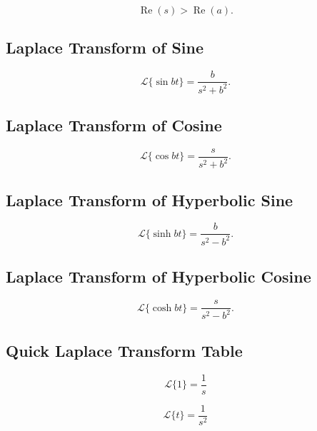 \[
\operatorname{Re}(s)>\operatorname{Re}(a).
\]

\subsection{Laplace Transform of Sine}
\label{subsec:laplace-sine}

\[
\boxed{
\mathcal{L}\{\sin bt\}
=
\frac{
b
}{
s^2+b^2
}.
}
\]

\subsection{Laplace Transform of Cosine}
\label{subsec:laplace-cosine}

\[
\boxed{
\mathcal{L}\{\cos bt\}
=
\frac{
s
}{
s^2+b^2
}.
}
\]

\subsection{Laplace Transform of Hyperbolic Sine}
\label{subsec:laplace-sinh}

\[
\boxed{
\mathcal{L}\{\sinh bt\}
=
\frac{
b
}{
s^2-b^2
}.
}
\]

\subsection{Laplace Transform of Hyperbolic Cosine}
\label{subsec:laplace-cosh}

\[
\boxed{
\mathcal{L}\{\cosh bt\}
=
\frac{
s
}{
s^2-b^2
}.
}
\]

\subsection{Quick Laplace Transform Table}
\label{subsec:quick-laplace-table}

\[
\boxed{
\mathcal{L}\{1\}
=
\frac1s
}
\]

\[
\boxed{
\mathcal{L}\{t\}
=
\frac1{s^2}
}
\]

